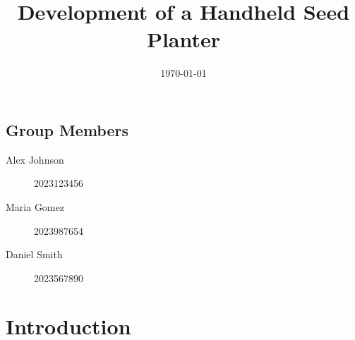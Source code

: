 \documentclass[a4paper,12pt]{report} %
\begin{document}
\title{ Development of a Handheld Seed Planter}

\date{\today}
\maketitle

\section*{Group Members}
\begin{description}
    \item[Alex Johnson] \hfill 2023123456
    \item[Maria Gomez] \hfill 2023987654
    \item[Daniel Smith] \hfill 2023567890
\end{description}


\chapter{Introduction}
% 
% 
% 




% 
\end{document}
